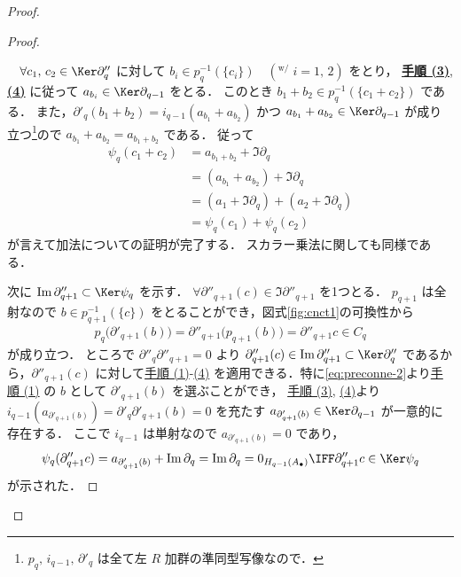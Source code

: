 \documentclass[algtopo_main]{subfiles}
\begin{document}
\begin{proof}
\begin{proof}
\begin{description}
            　$\forall c_1,\, c_2 \in \Ker \partial''_q$ に対して $b_i \in p_q^{-1}(\{c_i\})\quad ({}^{\mathrm{w}/}\; i = 1,\, 2)$ をとり，
            \hyperref[pro:3]{\textbf{手順 (3)}}, \hyperref[pro:4]{\textbf{(4)}} に従って
            $a_{b_i} \in \Ker \partial_{q-1}$ をとる．
            このとき $b_1 + b_2 \in p_q^{-1}(\{ c_1 + c_2 \})$ である．
            また，$\partial'_q(b_1 + b_2) = i_{q-1}(a_{b_1} + a_{b_2})$ 
            かつ $a_{b_1} + a_{b_2} \in \Ker \partial_{q-1}$ が成り立つ\footnote{$p_q,\, i_{q-1},\, \partial'_q$ は全て左 $R$ 加群の準同型写像なので．}ので
            $a_{b_1} + a_{b_2} = a_{b_1+b_2}$ である．
            従って
            \begin{align}
                \psi_q (c_1 + c_2) &= a_{b_1 + b_2} + \Im \partial_q \\
                &= (a_{b_1} + a_{b_2}) + \Im \partial_q \\
                &= (a_1 + \Im \partial_q) + (a_2 + \Im \partial_q) \\
                &= \psi_q(c_1) + \psi_q(c_2)
            \end{align}
            が言えて加法についての証明が完了する．
            スカラー乗法に関しても同様である．
        \end{description}

        次に $\Im \partial''_{q+1} \subset \Ker \psi_q$ を示す．
        $\forall \partial''_{q+1}(c) \in \Im \partial''_{q+1}$ を1つとる．
        $p_{q+1}$ は全射なので $b \in p_{q+1}^{-1}(\{c\})$ をとることができ，図式\ref{fig:cnct1}の可換性から 
        \begin{align}
            \label{eq:preconne-2}
            p_q \bigl( \partial'_{q+1}(b) \bigr) = \partial''_{q+1} \bigl( p_{q+1}(b) \bigr) = \partial''_{q+1} c \in C_q
        \end{align}
        が成り立つ．
        ところで $\partial''_q \partial''_{q+1} = 0$ より
        $\partial''_{q+1}(c) \in \Im \partial''_{q+1} \subset \Ker \partial''_q$ であるから，$\partial''_{q+1}(c)$ に対して\hyperref[pro:1]{手順 (1)}-\hyperref[pro:4]{(4)} を適用できる．特に\eqref{eq:preconne-2}より\hyperref[pro:1]{手順 (1)} の $b$ として $\partial'_{q+1}(b)$ を選ぶことができ，
        \hyperref[pro:3]{手順 (3)}, \hyperref[pro:4]{(4)}より $i_{q-1}(a_{\partial'_{q+1}(b)}) = \partial'_q \partial'_{q+1}(b) = 0$ を充たす $a_{\partial'_{q+1}(b)} \in \Ker \partial_{q-1}$ が一意的に存在する．
        ここで $i_{q-1}$ は単射なので $a_{\partial'_{q+1}(b)} = 0$ であり，
        \begin{align}
            \psi_q (\partial''_{q+1} c) = a_{\partial'_{q+1}(b)} + \Im \partial_q = \Im \partial_q = 0_{H_{q-1}(A_\bullet)} \IFF \partial''_{q+1} c \in \Ker \psi_q
        \end{align}
        が示された．
        

\end{proof}
\end{proof}
\end{document}
